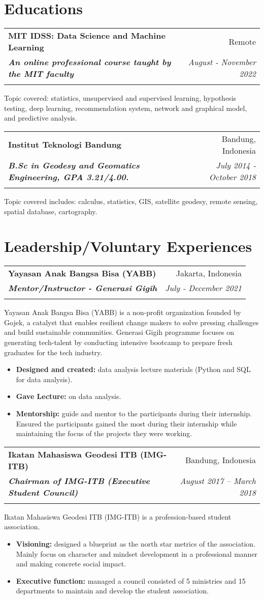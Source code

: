 \documentclass[a4paper, 11pt]{article}
\makeatletter
\newcommand{\resumeItem}[2]{
    \item\small{
        \textbf{#1}{#2 \vspace{-2pt}}
    }
}
\newcommand{\resumeSubheading}[4]{
    \vspace{-1pt}
    \begin{tabular*}{0.97\textwidth}{l@{\extracolsep{\fill}}r}
        \color{lightblue}\textbf{#1} & #2 \\
        \textbf{\textit{\small#3}} & \textit{\small #4} \\
        \textnormal{}\vspace{-5pt}
    \end{tabular*}\vspace{-5pt}
}
\newcommand{\resumeItemListStart}{\begin{itemize}[leftmargin=*]\setlength\itemsep{0em}\vspace{-1pt}}
\newcommand{\resumeItemListEnd}{\end{itemize}\vspace{-5pt}}
\makeatother
\begin{document}
    \vspace{-5pt}
    \section{Educations}

    \resumeSubheading
    {MIT IDSS: Data Science and Machine Learning}
    {Remote}
    {An online professional course taught by the MIT faculty}
    {August - November 2022}
    {Topic covered: statistics, unsupervised and supervised learning, hypothesis testing, 
    deep learning, recommendation system, network and graphical model, and predictive analysis.}
    
    \vspace{5pt}
    \resumeSubheading
    {Institut Teknologi Bandung}
    {Bandung, Indonesia}
    {B.Sc in Geodesy and Geomatics Engineering, GPA 3.21/4.00.}
    {July 2014 - October 2018}
    {Topic covered includes: calculus, statistics, GIS, satellite geodesy, 
    remote sensing, spatial database, cartography.}

    \vspace{-5pt}
    \section{Leadership/Voluntary Experiences}

    \resumeSubheading
    {Yayasan Anak Bangsa Bisa (YABB)}
    {Jakarta, Indonesia}
    {Mentor/Instructor - Generasi Gigih}
    {July - December 2021}
    {Yayasan Anak Bangsa Bisa (YABB) is a non-profit organization founded by Gojek, a catalyst that enables resilient change makers to
    solve pressing challenges and build sustainable communities. Generasi Gigih programme focuses on generating tech-talent by
    conducting intensive bootcamp to prepare fresh graduates for the tech industry.}
    \vspace{-5pt}
    \resumeItemListStart
    \resumeItem{Designed and created:}{ data analysis lecture materials (Python and SQL for data analysis).}
    \resumeItem{Gave Lecture:}{ on data analysis.}
    \resumeItem{Mentorship:}{ guide and mentor to the participants during their internship. Ensured the participants gained the most during their
    internship while maintaining the focus of the projects they were working.}
    \resumeItemListEnd

    \vspace{5pt}
    \resumeSubheading
    {Ikatan Mahasiswa Geodesi ITB (IMG-ITB)}
    {Bandung, Indonesia}
    {Chairman of IMG-ITB (Executive Student Council)}
    {August 2017 – March 2018}
    {Ikatan Mahasiswa Geodesi ITB (IMG-ITB) is a profession-based student association.}
    \vspace{-5pt}
    \resumeItemListStart
    \resumeItem{Visioning:}{ designed a blueprint as the north star metrics of the association. Mainly focus on character and mindset development in a
    professional manner and making concrete social impact.}
    \resumeItem{Executive function:}{ managed a council consisted of 5 ministries and 15 departments to maintain and develop the student association.}
    \resumeItemListEnd
\end{document}

